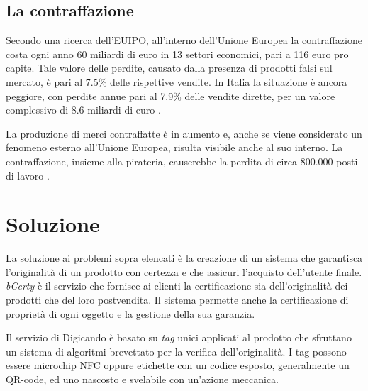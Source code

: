 \subsection{La contraffazione}
\label{la-contraffazione}
Secondo una ricerca dell'EUIPO, all'interno dell'Unione Europea la contraffazione costa ogni anno 60 miliardi di euro in 13 settori economici, pari a 116 euro pro capite. Tale valore delle perdite, causato dalla presenza di prodotti falsi sul mercato, è pari al 7.5\% delle rispettive vendite. In Italia la situazione è ancora peggiore, con perdite annue pari al 7.9\% delle vendite dirette, per un valore complessivo di 8.6 miliardi di euro \cite{euipo}.

La produzione di merci contraffatte è in aumento e, anche se viene considerato un fenomeno esterno all'Unione Europea, risulta visibile anche al suo interno. La contraffazione, insieme alla pirateria, causerebbe la perdita di circa 800.000 posti di lavoro \cite{eesc}.

\section{Soluzione}
\label{soluzione}
La soluzione ai problemi sopra elencati è la creazione di un sistema che garantisca l'originalità di un prodotto con certezza e che assicuri l'acquisto dell'utente finale. \emph{bCerty} è il servizio che fornisce ai clienti la certificazione sia dell'originalità dei prodotti che del loro postvendita. Il sistema permette anche la certificazione di proprietà di ogni oggetto e la gestione della sua garanzia.

Il servizio di Digicando è basato su \emph{tag} unici applicati al prodotto che sfruttano un sistema di algoritmi brevettato per la verifica dell'originalità. I tag possono essere microchip NFC oppure etichette con un codice esposto, generalmente un QR-code, ed uno nascosto e svelabile con un'azione meccanica.


